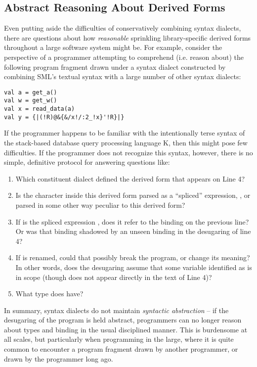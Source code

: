 \subsection{Abstract Reasoning About Derived Forms}\label{sec:abs-reasoning-intro}
Even putting aside the difficulties of conservatively combining syntax dialects, there are questions about how \emph{reasonable}  sprinkling library-specific derived forms throughout a large software system might be. 
For example, consider the perspective of a programmer attempting to comprehend (i.e. reason about) the following program fragment drawn under a syntax dialect constructed by combining SML's textual syntax with a large number of other syntax dialects:
\begin{lstlisting}
val a = get_a()
val w = get_w()
val x = read_data(a)
val y = {|(!R)@&{&/x!/:2_!x}'!R}|}
\end{lstlisting}

If the programmer happens to be familiar with the intentionally terse syntax of the stack-based database query processing language K, then this might pose few difficulties. If the programmer does not recognize this syntax, however, there is no simple, definitive protocol for answering questions like:

\begin{enumerate}
\item Which constituent dialect defined the derived form that appears on Line 4?
\item Is the character  inside this derived form parsed as a ``spliced'' expression, , or parsed in some other way peculiar to this derived form?
\item If  is the spliced expression , does it refer to the binding on the previous line? Or was that binding shadowed by an unseen binding in the desugaring of line 4?
\item If  is renamed, could that possibly break the program, or change its meaning? In other words, does the desugaring  assume that some variable identified as  is in scope (though  does not appear directly in the text of Line 4)?
\item What type does  have?
\end{enumerate}
In summary, syntax dialects do not maintain \emph{syntactic abstraction} -- if the desugaring of the program is held abstract, programmers can no longer reason about types and binding in the usual disciplined manner. This is burdensome at all scales, but particularly when programming in the large, where it is quite common to encounter a program fragment drawn by another programmer, or drawn by the programmer long ago.

